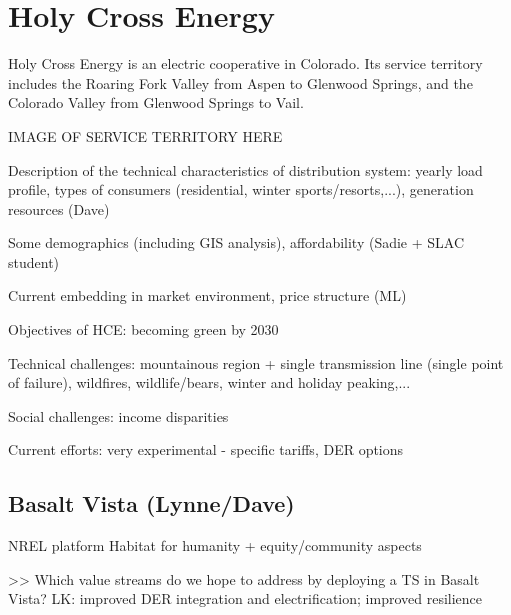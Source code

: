 \chapter{Holy Cross Energy}\label{sec:hce}

Holy Cross Energy is an electric cooperative in Colorado. Its service territory includes the Roaring Fork Valley from Aspen to Glenwood Springs, and the Colorado Valley from Glenwood Springs to Vail.

IMAGE OF SERVICE TERRITORY HERE

Description of the technical characteristics of distribution system: yearly load profile, types of consumers (residential, winter sports/resorts,...), generation resources (Dave)

Some demographics (including GIS analysis), affordability (Sadie + SLAC student)

Current embedding in market environment, price structure (ML)

Objectives of HCE: becoming green by 2030

Technical challenges: mountainous region + single transmission line (single point of failure), wildfires, wildlife/bears, winter and holiday peaking,...

Social challenges: income disparities

Current efforts: very experimental - specific tariffs, DER options

\section{Basalt Vista (Lynne/Dave)}

NREL platform
Habitat for humanity + equity/community aspects

>> Which value streams do we hope to address by deploying a TS in Basalt Vista? LK: improved DER integration and electrification; improved resilience
